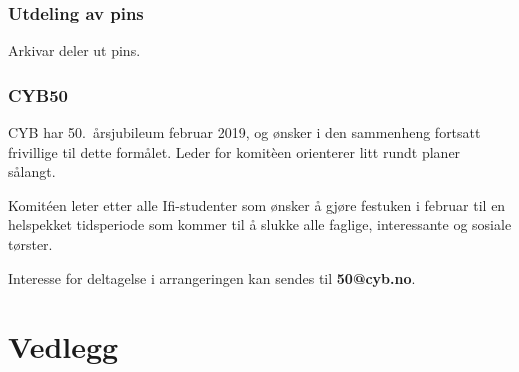 \documentclass[10pt,norsk,a4paper]{article}
\begin{document}
\section{Utdeling av pins}

Arkivar deler ut pins.

\section{CYB50}

CYB har 50.~årsjubileum februar 2019, og ønsker i den sammenheng fortsatt frivillige til dette formålet. Leder for komitèen orienterer litt rundt planer sålangt.

Komitéen leter etter alle Ifi-studenter som ønsker å gjøre festuken i februar til en helspekket tidsperiode som kommer til å slukke alle faglige, interessante og sosiale tørster.

Interesse for deltagelse i arrangeringen kan sendes til \textbf{50@cyb.no}.


\part*{Vedlegg}\label{lastpage}

\newpage
{}

\end{document}

